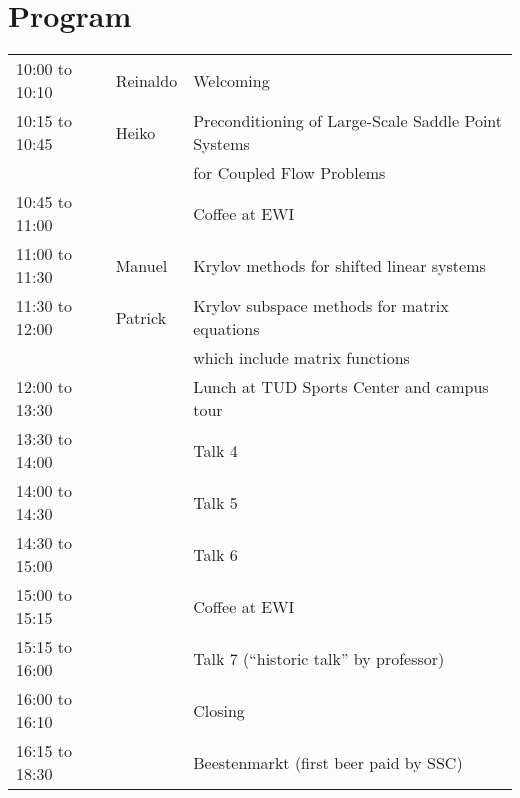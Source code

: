\documentclass{article}
\begin{document}
\section{Program}
\begin{table}[h]
\begin{tabular}{|l|l|l|}
\hline
10:00 to 10:10 & Reinaldo & Welcoming \\
10:15 to 10:45 & Heiko & Preconditioning of Large-Scale Saddle Point Systems \\ 
 & & for Coupled Flow Problems\\
10:45 to 11:00 & & Coffee at EWI\\ 
11:00 to 11:30 & Manuel & Krylov methods for shifted linear systems\\
11:30 to 12:00 & Patrick &  Krylov subspace methods for matrix equations\\
 & & which include matrix functions\\
12:00 to 13:30 & &  Lunch at TUD Sports Center and campus tour\\
13:30 to 14:00 & & Talk 4\\
14:00 to 14:30 & & Talk 5\\
14:30 to 15:00 & & Talk 6\\
15:00 to 15:15 & &  Coffee at EWI \\
15:15 to 16:00 & & Talk 7 (``historic talk'' by professor)\\
16:00 to 16:10 & &  Closing\\
16:15 to 18:30 & & Beestenmarkt (first beer paid by SSC) \\
\hline
\end{tabular}
\end{table}
\end{document}
